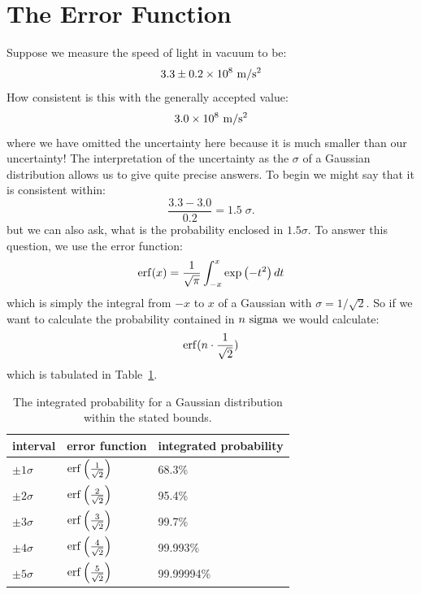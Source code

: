 \documentclass[12pt,oneside]{book}
\begin{document}
\section{The Error Function}

Suppose we measure the speed of light in vacuum to be:
\begin{displaymath}
3.3 \pm 0.2 \times 10^8~{\rm m}/{\rm s}^2
\end{displaymath}
How consistent is this with the generally accepted value:
\begin{displaymath}
3.0 \times 10^8~{\rm m}/{\rm s}^2
\end{displaymath}
where we have omitted the uncertainty here because it is much smaller than our uncertainty!   The interpretation of the uncertainty as the $\sigma$ of a Gaussian distribution allows us to give quite precise answers.  To begin we might say that it is consistent within:
\begin{displaymath}
\frac{3.3 - 3.0}{0.2} = 1.5 \; \sigma.
\end{displaymath}
but we can also ask, what is the probability enclosed in $1.5 \sigma$.  To  answer this question, we use the error function:
\begin{displaymath}
{\rm erf}(x) = \frac{1}{\sqrt{\pi}} \int^x_{-x} \exp\left(-t^2 \right) dt
\end{displaymath}
which is simply the integral from $-x$ to $x$ of a Gaussian with $\sigma = 1/\sqrt{2}$.  So if we want to calculate the probability contained in $n~\rm sigma$ we would calculate:
\begin{displaymath}
 {\rm erf}(n \cdot \frac{1}{\sqrt{2}})
\end{displaymath}
which is tabulated in Table~\ref{tbl:erf}.\\

\begin{table}[thb]
\begin{center}
\begin{tabular}{lll}
interval & error function & integrated probability \\ 
\hline
$\pm1 \sigma$ & ${\rm erf}\left( \frac{1}{\sqrt{2}} \right)$ & 68.3\% \\
$\pm2 \sigma$ & ${\rm erf}\left( \frac{2}{\sqrt{2}} \right)$ & 95.4\% \\
$\pm3 \sigma$ & ${\rm erf}\left( \frac{3}{\sqrt{2}} \right)$ & 99.7\% \\
$\pm4 \sigma$ & ${\rm erf}\left( \frac{4}{\sqrt{2}} \right)$ & 99.993\% \\
$\pm5 \sigma$ & ${\rm erf}\left( \frac{5}{\sqrt{2}} \right)$ & 99.99994\% \\ 
\end{tabular}
\caption{\label{tbl:erf} The integrated probability for a Gaussian distribution within the stated bounds.} 
\end{center}
\end{table}
\end{document}
